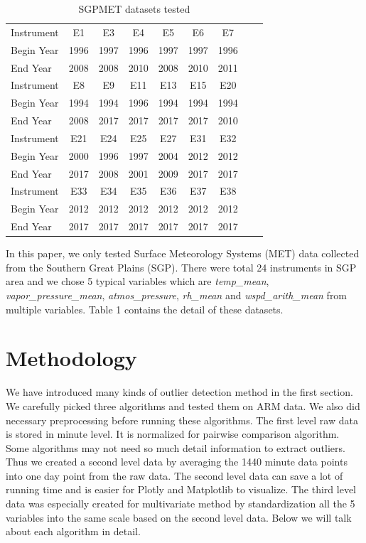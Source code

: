 \documentclass[letterpaper, 10 pt, conference]{ieeeconf}  %
\begin{document}
\begin{table}[ht]
\caption{SGPMET datasets tested}
\label{tab:datasets}
\centering
\begin{tabular}{|l|c|c|c|c|c|c|c|c|}
\hline
Instrument & E1 & E3 & E4 & E5 & E6 & E7\\
Begin Year & 1996 & 1997 & 1996 & 1997 & 1997 & 1996\\
End Year & 2008 & 2008 & 2010 & 2008 & 2010 & 2011\\
\hline
Instrument & E8 & E9 & E11 & E13 & E15 & E20\\
Begin Year & 1994 & 1994 & 1996 & 1994 & 1994 & 1994\\
End Year & 2008 & 2017 & 2017 & 2017 & 2017 & 2010\\
\hline
Instrument & E21 & E24 & E25 & E27 & E31 & E32\\
Begin Year & 2000 & 1996 & 1997 & 2004 & 2012 & 2012\\
End Year & 2017 & 2008 & 2001 & 2009 & 2017 & 2017\\
\hline
Instrument & E33 & E34 & E35 & E36 & E37 & E38\\
Begin Year & 2012 & 2012 & 2012 & 2012 & 2012 & 2012\\
End Year & 2017 & 2017 & 2017 & 2017 & 2017 & 2017\\
\hline
\end{tabular}
\end{table}

In this paper, we only tested Surface Meteorology Systems (MET) data collected from the Southern Great Plains (SGP). There were total 24 instruments in SGP area and we chose 5 typical variables which are \textit{temp\_mean}, \textit{vapor\_pressure\_mean}, \textit{atmos\_pressure}, \textit{rh\_mean} and \textit{wspd\_arith\_mean} from multiple variables. Table 1 contains the detail of these datasets. 

\section{Methodology}
We have introduced many kinds of outlier detection method in the first section. We carefully picked three algorithms and tested them on ARM data. We also did necessary preprocessing before running these algorithms. The first level raw data is stored in minute level. It is normalized for pairwise comparison algorithm. Some algorithms may not need so much detail information to extract outliers. Thus we created a second level data by averaging the 1440 minute data points into one day point from the raw data. The second level data can save a lot of running time and is easier for Plotly \cite{plotly} and Matplotlib \cite{Hunter:2007} to visualize. The third level data was especially created for multivariate method by standardization all the 5 variables into the same scale based on the second level data. Below we will talk about each algorithm in detail. 
\end{document}

